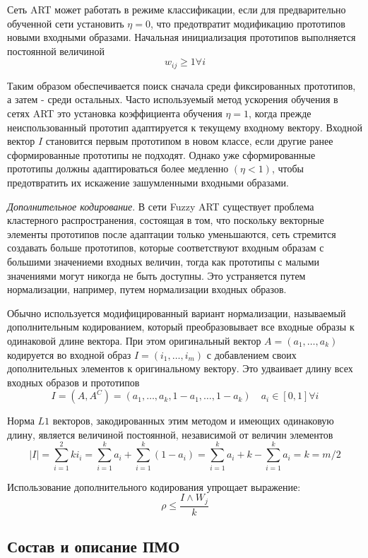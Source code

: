 Сеть  ART  может  работать  в  режиме  классификации,  если  для  предварительно  обученной сети установить $\eta = 0$, что предотвратит модификацию  прототипов  новыми  входными  образами. Начальная инициализация прототипов  выполняется постоянной величиной
$$
	w_{ij} \geq 1 \forall i
$$

Таким  образом  обеспечивается  поиск  сначала среди фиксированных прототипов, а затем - среди остальных. Часто используемый метод ускорения обучения  в  сетях  ART  это  установка  коэффициента обучения $\eta = 1$, когда прежде неиспользованный прототип адаптируется к текущему входному вектору. Входной вектор $I$ становится первым прототипом в новом классе, если другие ранее сформированные прототипы не подходят. Однако уже сформированные  прототипы  должны  адаптироваться  более  медленно  $(\eta  <  1)$,  чтобы  предотвратить их искажение зашумленными входными образами.

\textit{Дополнительное кодирование}. В сети Fuzzy ART существует  проблема  кластерного  распространения,  состоящая  в  том,  что  поскольку  векторные
элементы  прототипов  после  адаптации  только уменьшаются,  сеть  стремится  создавать  больше прототипов,  которые  соответствуют  входным  образам с большими значениеми входных величин, тогда как прототипы с малыми значениями могут 
никогда не быть доступны. Это устраняется путем нормализации,  например,  путем  нормализации входных образов.

Обычно  используется  модифицированный  вариант  нормализации,  называемый  дополнительным кодированием, который преобразовывает все входные образы к одинаковой длине вектора. При этом оригинальный вектор  $A=(a_1, \dots ,a_k  )$ кодируется во входной образ  $I=(i_1, \ldots, i_m)$ с добавлением своих дополнительных элементов к оригинальному вектору. Это удваивает длину всех входных образов и прототипов
$$
	I = (A,A^C) = (a_1, \ldots, a_k, 1-a_1, \ldots, 1-a_k) \quad a_i \in [0,1] \forall i
$$

Норма $L1$ векторов, закодированных этим методом  и  имеющих  одинаковую  длину,  является величиной постоянной, независимой от  величин элементов
$$
	|I| = \sum_{i=1}^2k i_i = \sum_{i=1}^k a_i + \sum_{i=1}^k (1 - a_i) = \sum_{i=1}^k a_i + k - \sum_{i=1}^k a_i = k = m / 2 
$$

Использование  дополнительного  кодирования упрощает выражение:
$$
	\rho \leq \frac{I \wedge W_j}{k}
$$




\subsection{Состав и описание ПМО}

